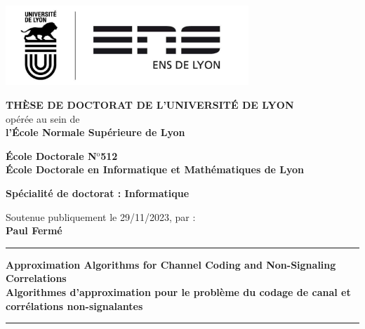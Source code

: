 \documentclass[11pt,a4paper]{book}
\begin{document}
\setlength{\parindent}{0pt}
\thispagestyle{empty}

\begin{center}
\includegraphics[height=3cm]{logo} %
\end{center}


\fontsize{11pt}{13pt}\selectfont

\vspace{1cm}

\begin{center}
\fontsize{14pt}{16pt}\selectfont
\textbf{\uppercase{Thèse de doctorat de l'université de Lyon}}\\
\fontsize{12pt}{14pt}\selectfont
opérée au sein de\\
\textbf{l'École Normale Supérieure de Lyon}

\vspace{0.5cm}

\textbf{École Doctorale N$^{\mathrm{o}}$512\\%
École Doctorale en Informatique et Mathématiques de Lyon}%

\vspace{0.5cm}

\textbf{Spécialité de doctorat : Informatique\\
}


\vspace{1.5cm}

Soutenue publiquement le 29/11/2023, par :\\
\fontsize{14pt}{16pt}\selectfont
\textbf{Paul Fermé}

\vspace{1.5cm} %

\rule[20pt]{\textwidth}{0.5pt}

\fontsize{25pt}{28pt}\selectfont
\textbf{Approximation Algorithms for Channel Coding and Non-Signaling Correlations}\\[.5em]
\fontsize{18pt}{21pt}\selectfont
\textbf{Algorithmes d'approximation pour le problème du codage de canal et corrélations non-signalantes}

\rule{\textwidth}{0.5pt}

\vspace{1cm} %
\end{center}
\end{document}

